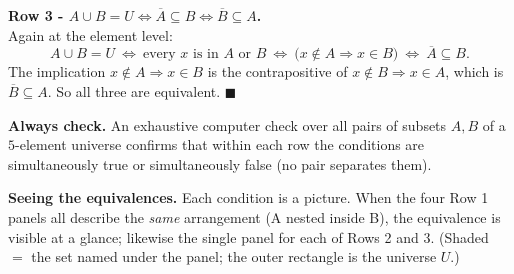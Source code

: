 \documentclass[11pt,a4paper]{article}
\begin{document}
\textbf{Row 3 - $A\cup B=U\Leftrightarrow \overline{A}\subseteq B\Leftrightarrow \overline{B}\subseteq A$.}\\
Again at the element level:
$$A\cup B=U
\ \Longleftrightarrow\ \text{every }x\text{ is in }A\text{ or }B
\ \Longleftrightarrow\ \bigl(x\notin A\Rightarrow x\in B\bigr)
\ \Longleftrightarrow\ \overline{A}\subseteq B.$$
The implication \textquotedbl{}$x\notin A\Rightarrow x\in B$\textquotedbl{} is the contrapositive
of \textquotedbl{}$x\notin B\Rightarrow x\in A$\textquotedbl{}, which is $\overline{B}\subseteq A$.
So all three are equivalent. $\blacksquare$

\textbf{Always check.} An exhaustive computer check over all pairs of subsets $A,B$ of a $5$-element
universe confirms that within each row the conditions are simultaneously true or simultaneously
false (no pair separates them). \checkmark

\textbf{Seeing the equivalences.} Each condition is a picture. When the four Row 1 panels all
describe the \emph{same} arrangement (A nested inside B), the equivalence is visible at a glance;
likewise the single panel for each of Rows 2 and 3. (Shaded $=$ the set named under the panel;
the outer rectangle is the universe $U$.)
\end{document}
